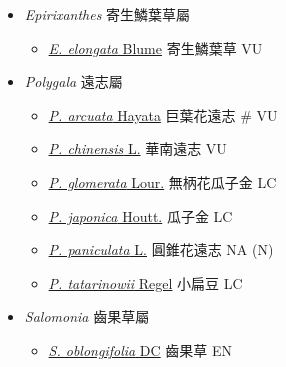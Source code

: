 
  \begin{itemize}
 \item[] \textit{Epirixanthes} 寄生鱗葉草屬
                                
  \begin{itemize}
        \item[] \href{http://www.theplantlist.org/tpl1.1/search?q=Epirixanthes+elongata}{\textit{E. elongata} Blume}   寄生鱗葉草   VU
  \end{itemize}
 \item[] \textit{Polygala} 遠志屬
                                
  \begin{itemize}
        \item[] \href{http://www.theplantlist.org/tpl1.1/search?q=Polygala+arcuata}{\textit{P. arcuata} Hayata}   巨葉花遠志  \# VU
        \item[] \href{http://www.theplantlist.org/tpl1.1/search?q=Polygala+chinensis}{\textit{P. chinensis} L.}   華南遠志   VU
        \item[] \href{http://www.theplantlist.org/tpl1.1/search?q=Polygala+glomerata}{\textit{P. glomerata} Lour.}   無柄花瓜子金   LC
        \item[] \href{http://www.theplantlist.org/tpl1.1/search?q=Polygala+japonica}{\textit{P. japonica} Houtt.}   瓜子金   LC
        \item[] \href{http://www.theplantlist.org/tpl1.1/search?q=Polygala+paniculata}{\textit{P. paniculata} L.}   圓錐花遠志   NA (N)
        \item[] \href{http://www.theplantlist.org/tpl1.1/search?q=Polygala+tatarinowii}{\textit{P. tatarinowii} Regel}   小扁豆   LC
  \end{itemize}
 \item[] \textit{Salomonia} 齒果草屬
                                
  \begin{itemize}
        \item[] \href{http://www.theplantlist.org/tpl1.1/search?q=Salomonia+oblongifolia}{\textit{S. oblongifolia} DC}   齒果草   EN
  \end{itemize}
  \end{itemize}
